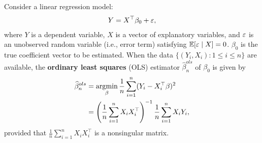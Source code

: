 \documentclass[11pt, A4paper, openany, uplatex]{book}
\begin{document}
Consider a linear regression model:
\begin{align}\label{eq:linmodel}
	Y = X^\top \beta_0 + \varepsilon, 
\end{align}
where $Y$ is a dependent variable, $X$ is a vector of explanatory variables, and $\varepsilon$ is an unobserved random variable (i.e., error term) satisfying $\mathbb{E}[\varepsilon \mid X] = 0$.
$\beta_0$ is the true coefficient vector to be estimated.
When the data $\{(Y_i, X_i): 1 \le i \le n\}$ are available, the \textbf{ordinary least squares} (OLS) estimator $\hat \beta_n^{ols}$ of $\beta_0$ is given by
\begin{align}\label{eq:ols}
\begin{split}
	\widehat \beta_n^{ols} 
	& = \operatorname*{\arg\!\min}_{\beta} \frac{1}{n}\sum_{i = 1}^n (Y_i - X_i^\top \beta)^2 \\
	& = \left(\frac{1}{n}\sum_{i = 1}^n X_i X_i^\top \right)^{-1}\frac{1}{n}\sum_{i = 1}^n X_i Y_i,
\end{split}
\end{align}
provided that $\frac{1}{n}\sum_{i = 1}^n X_i X_i^\top$ is a nonsingular matrix. 
\end{document}
